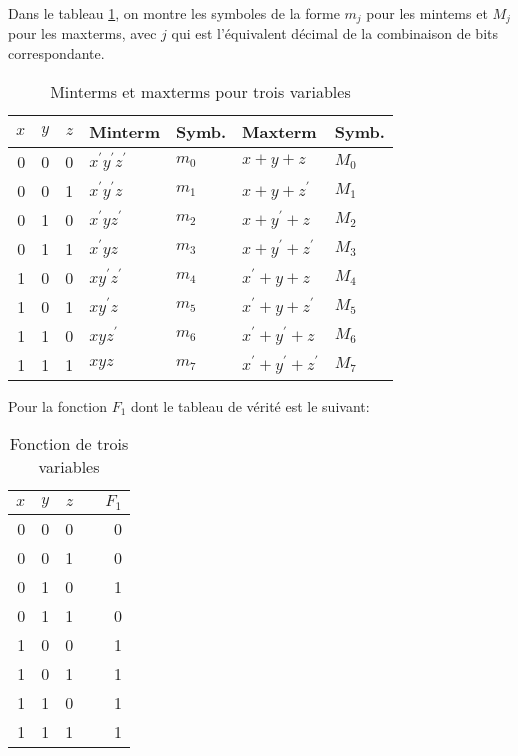 \documentclass[11pt]{article}
\begin{document}
Dans le tableau \ref{tab:org44b3a2b}, on montre les symboles de la forme
\(m_j\) pour les mintems et \(M_j\) pour les maxterms, avec \(j\) qui
est l'équivalent décimal de la combinaison de bits correspondante.

\begin{table}[htbp]
\caption{\label{tab:org44b3a2b}Minterms et maxterms pour trois variables}
\centering
\begin{tabular}{rrrllll}
\(x\) & \(y\) & \(z\) & Minterm & Symb. & Maxterm & Symb.\\
\hline
0 & 0 & 0 & \(x^\prime y^\prime z^\prime\) & \(m_0\) & \(x+ y+ z\) & \(M_0\)\\
0 & 0 & 1 & \(x^\prime y^\prime z\) & \(m_1\) & \(x+ y+ z^\prime\) & \(M_1\)\\
0 & 1 & 0 & \(x^\prime y z^\prime\) & \(m_2\) & \(x+ y^\prime+ z\) & \(M_2\)\\
0 & 1 & 1 & \(x^\prime y z\) & \(m_3\) & \(x+ y^\prime+ z^\prime\) & \(M_3\)\\
1 & 0 & 0 & \(x y^\prime z^\prime\) & \(m_4\) & \(x^\prime+ y+ z\) & \(M_4\)\\
1 & 0 & 1 & \(x y^\prime z\) & \(m_5\) & \(x^\prime+ y+ z^\prime\) & \(M_5\)\\
1 & 1 & 0 & \(x y z^\prime\) & \(m_6\) & \(x^\prime+ y^\prime+ z\) & \(M_6\)\\
1 & 1 & 1 & \(x y z\) & \(m_7\) & \(x^\prime + y^\prime+ z^\prime\) & \(M_7\)\\
\end{tabular}
\end{table}

Pour la fonction \(F_1\) dont le tableau de vérité est le suivant: 

\begin{table}[htbp]
\caption{\label{tab:org14d08c1}Fonction de trois variables}
\centering
\begin{tabular}{rrrlr}
\(x\) & \(y\) & \(z\) &  & \(F_1\)\\
\hline
0 & 0 & 0 &  & 0\\
0 & 0 & 1 &  & 0\\
0 & 1 & 0 &  & 1\\
0 & 1 & 1 &  & 0\\
1 & 0 & 0 &  & 1\\
1 & 0 & 1 &  & 1\\
1 & 1 & 0 &  & 1\\
1 & 1 & 1 &  & 1\\
\end{tabular}
\end{table}
\end{document}
